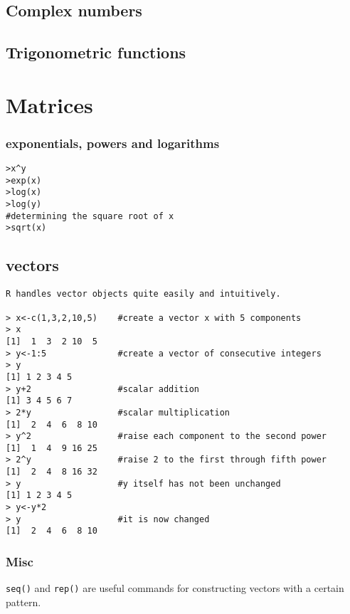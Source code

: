 \documentclass[a4paper,12pt]{article}
\begin{document}
\subsection{Complex numbers}
\subsection{Trigonometric functions}
\section{Matrices}



\subsubsection{exponentials, powers and logarithms}
\footnotesize
\begin{myindentpar}{1cm}
\begin{verbatim}
>x^y
>exp(x)
>log(x)
>log(y)
#determining the square root of x
>sqrt(x)
\end{verbatim}
\end{myindentpar}
\normalsize
\subsection{vectors}
\footnotesize
\begin{myindentpar}{1cm}
\begin{verbatim}
R handles vector objects quite easily and intuitively.

> x<-c(1,3,2,10,5)    #create a vector x with 5 components
> x
[1]  1  3  2 10  5
> y<-1:5              #create a vector of consecutive integers
> y
[1] 1 2 3 4 5
> y+2                 #scalar addition
[1] 3 4 5 6 7
> 2*y                 #scalar multiplication
[1]  2  4  6  8 10
> y^2                 #raise each component to the second power
[1]  1  4  9 16 25
> 2^y                 #raise 2 to the first through fifth power
[1]  2  4  8 16 32
> y                   #y itself has not been unchanged
[1] 1 2 3 4 5
> y<-y*2
> y                   #it is now changed
[1]  2  4  6  8 10
\end{verbatim}
\end{myindentpar}
\normalsize

\subsubsection{Misc}
\texttt{seq()} and \texttt{rep()} are useful commands for constructing vectors with a certain pattern.
\end{document}
